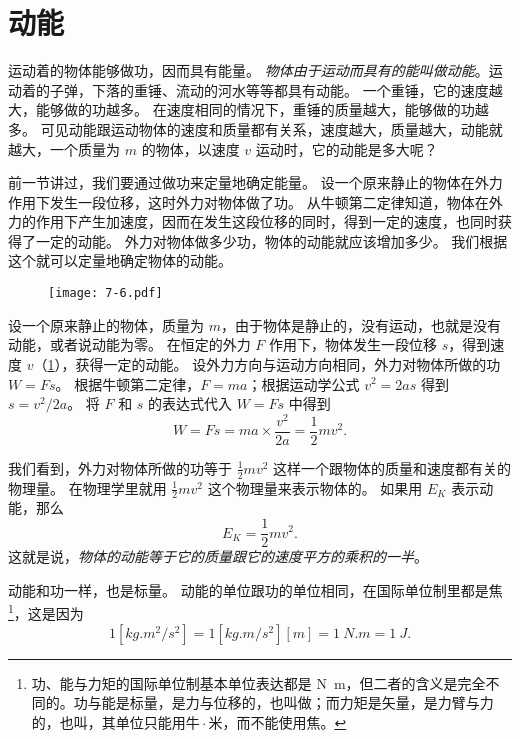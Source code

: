\section{动能}
运动着的物体能够做功，因而具有能量。
\emph{物体由于运动而具有的能叫做动能}。运动着的子弹，下落的重锤、流动的河水等等都具有动能。
一个重锤，它的速度越大，能够做的功越多。
在速度相同的情况下，重锤的质量越大，能够做的功越多。
可见动能跟运动物体的速度和质量都有关系，速度越大，质量越大，动能就越大，一个质量为 $m$ 的物体，以速度 $v$ 运动时，它的动能是多大呢？
	
前一节讲过，我们要通过做功来定量地确定能量。
设一个原来静止的物体在外力作用下发生一段位移，这时外力对物体做了功。
从牛顿第二定律知道，物体在外力的作用下产生加速度，因而在发生这段位移的同时，得到一定的速度，也同时获得了一定的动能。
外力对物体做多少功，物体的动能就应该增加多少。
我们根据这个就可以定量地确定物体的动能。

\begin{figure}
  \texttt{[image: 7-6.pdf]}
  \caption{}\label{fig:7-6}
\end{figure}

设一个原来静止的物体，质量为 $m$，由于物体是静止的，没有运动，也就是没有动能，或者说动能为零。
在恒定的外力 $F$ 作用下，物体发生一段位移 $s$，得到速度 $v$（\cref{fig:7-6}），获得一定的动能。
设外力方向与运动方向相同，外力对物体所做的功 $W=Fs$。
根据牛顿第二定律，$F=ma$；根据运动学公式 $v^2=2as$ 得到 $s=v^2/2a$。
将 $F$ 和 $s$ 的表达式代入 $W=Fs$ 中得到
\[W=Fs=ma\times \frac{v^2}{2a}=\frac{1}{2}mv^2.\]

我们看到，外力对物体所做的功等于 $\frac{1}{2}mv^2$ 这样一个跟物体的质量和速度都有关的物理量。
在物理学里就用 $\frac{1}{2}mv^2$ 这个物理量来表示物体的。
如果用 $E_K$ 表示动能，那么	
\[E_K=\frac{1}{2}mv^2.\]
这就是说，\emph{物体的动能等于它的质量跟它的速度平方的乘积的一半}。

动能和功一样，也是标量。
动能的单位跟功的单位相同，在国际单位制里都是焦\footnote{功、能与力矩的国际单位制基本单位表达都是 \unit{N.m}，但二者的含义是完全不同的。功与能是标量，是力与位移的，也叫做；而力矩是矢量，是力臂与力的，也叫，其单位只能用牛\,$\cdot$\,米，而不能使用焦。}，这是因为
\[1[\unit{kg.m^2/s^2}]=1[\unit{kg.m/s^2}][\unit{m}]=\qty{1}{N.m}=\qty{1}{J}.\]

